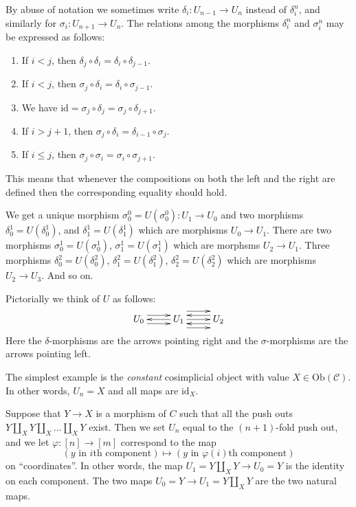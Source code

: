 \begin{remark}
\label{remark-relations-cosimplicial}
By abuse of notation we sometimes write $\delta_i : U_{n - 1} \to U_n$
instead of $\delta^n_i$, and similarly for $\sigma_i : U_{n + 1} \to U_n$.
The relations among the morphisms $\delta^n_i$ and $\sigma^n_i$
may be expressed as follows:
\begin{enumerate}
\item If $i < j$, then
$\delta_j \circ \delta_i = \delta_i \circ \delta_{j - 1}$.
\item If $i < j$, then
$\sigma_j \circ \delta_i = \delta_i \circ \sigma_{j - 1}$.
\item We have
$\text{id} = \sigma_j \circ \delta_j = \sigma_j \circ \delta_{j + 1}$.
\item If $i > j + 1$, then
$\sigma_j \circ \delta_i = \delta_{i - 1} \circ \sigma_j$.
\item If $i \leq j$, then
$\sigma_j \circ \sigma_i = \sigma_i \circ \sigma_{j + 1}$.
\end{enumerate}
This means that whenever the compositions on both the left and the
right are defined then the corresponding equality should hold.
\end{remark}

\noindent
We get a unique morphism $\sigma^0_0 = U(\sigma^0_0) : U_1 \to U_0$ and
two morphisms $\delta^1_0 = U(\delta^1_0)$, and
$\delta^1_1 = U(\delta^1_1)$ which are morphisms $U_0 \to U_1$.
There are two morphisms
$\sigma^1_0 = U(\sigma^1_0)$, $\sigma^1_1 = U(\sigma^1_1)$
which are morphsms $U_2 \to U_1$. Three morphisms
$\delta^2_0 = U(\delta^2_0)$, $\delta^2_1 = U(\delta^2_1)$,
$\delta^2_2 = U(\delta^2_2)$
which are morphisms $U_2 \to U_3$. And so on.

\medskip\noindent
Pictorially we think of $U$ as follows:
$$
\xymatrix{
U_0
\ar@<1ex>[r]
\ar@<-1ex>[r]
&
U_1
\ar@<0ex>[l]
\ar@<2ex>[r]
\ar@<0ex>[r]
\ar@<-2ex>[r]
&
U_2
\ar@<1ex>[l]
\ar@<-1ex>[l]
}
$$
Here the $\delta$-morphisms are the arrows pointing right and the
$\sigma$-morphisms are the arrows pointing left.

\begin{example}
\label{example-constant-cosimplicial-object}
The simplest example is the {\it constant} cosimplicial object with
value $X \in \text{Ob}(\mathcal{C})$. In other words, $U_n = X$ and
all maps are $\text{id}_X$.
\end{example}

\begin{example}
\label{example-push-outs-simplicial-object}
Suppose that $Y\to X$ is a morphism of $C$ such that all
the push outs $Y\coprod_X Y \coprod_X \ldots \coprod_X Y$ exist.
Then we set $U_n$ equal to the $(n + 1)$-fold push out,
and we let $\varphi: [n] \to [m]$ correspond to the map
$$
(y \text{ in }i\text{th component})
\mapsto
(y \text{ in }\varphi(i)\text{th component})
$$
on ``coordinates''.
In other words, the map $U_1 = Y \coprod_X Y \to U_0 = Y$ is the
identity on each component.
The two maps $U_0 = Y \to U_1 = Y \coprod_X Y$ are the two
natural maps.
\end{example}

